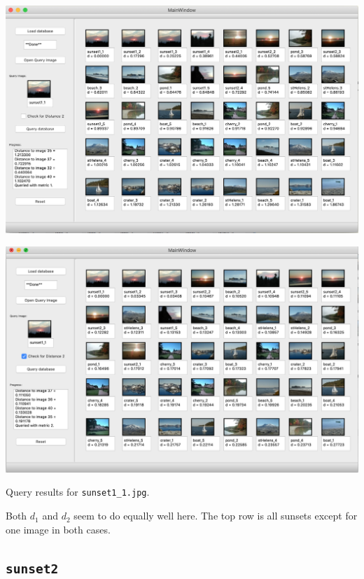 \documentclass[letterpaper]{article}
\begin{document}
\begin{center}
  \includegraphics[width=\textwidth]{sunset1_1_distance1.png}
  
  \includegraphics[width=\textwidth]{sunset1_1_distance2.png}
  
  Query results for \texttt{sunset1\_1.jpg}.  
\end{center}

Both $d_1$ and $d_2$ seem to do equally well here. The top row is all sunsets
except for one image in both cases.

\subsection{\texttt{sunset2}}
\end{document}
